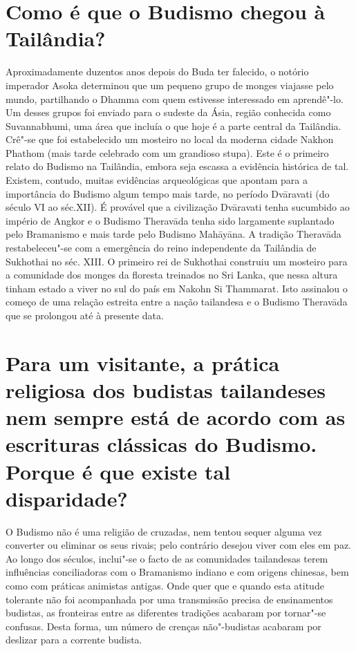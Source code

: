 \section{Como é que o Budismo chegou à Tailândia?}

Aproximadamente duzentos anos depois do Buda ter falecido, o notório
imperador Asoka determinou que um pequeno grupo de monges viajasse pelo
mundo, partilhando o Dhamma com quem estivesse interessado em
aprendê"-lo. Um desses grupos foi enviado para o sudeste da Ásia, região
conhecida como Suvannabhumi, uma área que incluía o que hoje é a parte
central da Tailândia. Crê"-se que foi estabelecido um mosteiro no local
da moderna cidade Nakhon Phathom (mais tarde celebrado com um grandioso
stupa). Este é o primeiro relato do Budismo na Tailândia, embora seja
escassa a evidência histórica de tal. Existem, contudo, muitas
evidências arqueológicas que apontam para a importância do Budismo algum
tempo mais tarde, no período Dvāravati (do século VI ao séc.XII). É
provável que a civilização Dvāravati tenha sucumbido ao império de
Angkor e o Budismo Theravāda tenha sido largamente suplantado pelo
Bramanismo e mais tarde pelo Budismo Mahāyāna. A tradição Theravāda
restabeleceu"-se com a emergência do reino independente da Tailândia de
Sukhothai no séc. XIII. O primeiro rei de Sukhothai construiu um
mosteiro para a comunidade dos monges da floresta treinados no Sri
Lanka, que nessa altura tinham estado a viver no sul do país em Nakohn
Si Thammarat. Isto assinalou o começo de uma relação estreita entre a
nação tailandesa e o Budismo Theravāda que se prolongou até à presente
data.

\section{Para um visitante, a prática religiosa dos budistas tailandeses nem
  sempre está de acordo com as escrituras clássicas do Budismo. Porque é que
  existe tal disparidade?}

O Budismo não é uma religião de cruzadas, nem tentou sequer alguma vez
converter ou eliminar os seus rivais; pelo contrário desejou viver com
eles em paz. Ao longo dos séculos, inclui"-se o facto de as comunidades
tailandesas terem influências conciliadoras com o Bramanismo indiano e
com origens chinesas, bem como com práticas animistas antigas. Onde quer
que e quando esta atitude tolerante não foi acompanhada por uma
transmissão precisa de ensinamentos budistas, as fronteiras entre as
diferentes tradições acabaram por tornar"-se confusas. Desta forma, um
número de crenças não"-budistas acabaram por deslizar para a corrente
budista.

